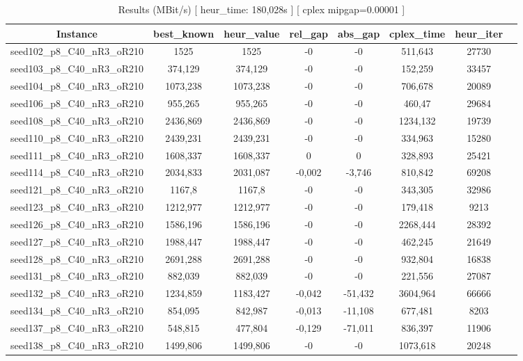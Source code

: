 \documentclass[a4paper]{article}
\begin{document}
\begin{center}
\begin{longtable}{cccccccc}
\caption{Results (MBit/s) [ heur\_time: 180,028s ]  [ cplex mipgap=0.00001 ]}
\tabularnewline
\hline
Instance & best\_known & heur\_value & rel\_gap & abs\_gap & cplex\_time & heur\_iter\\
\hline
seed102\_p8\_C40\_nR3\_oR210 & 1525 & 1525 & -0 & -0 & 511,643 & 27730\\
\hline
seed103\_p8\_C40\_nR3\_oR210 & 374,129 & 374,129 & -0 & -0 & 152,259 & 33457\\
\hline
seed104\_p8\_C40\_nR3\_oR210 & 1073,238 & 1073,238 & -0 & -0 & 706,678 & 20089\\
\hline
seed106\_p8\_C40\_nR3\_oR210 & 955,265 & 955,265 & -0 & -0 & 460,47 & 29684\\
\hline
seed108\_p8\_C40\_nR3\_oR210 & 2436,869 & 2436,869 & -0 & -0 & 1234,132 & 19739\\
\hline
seed110\_p8\_C40\_nR3\_oR210 & 2439,231 & 2439,231 & -0 & -0 & 334,963 & 15280\\
\hline
seed111\_p8\_C40\_nR3\_oR210 & 1608,337 & 1608,337 & 0 & 0 & 328,893 & 25421\\
\hline
seed114\_p8\_C40\_nR3\_oR210 & 2034,833 & 2031,087 & -0,002 & -3,746 & 810,842 & 69208\\
\hline
seed121\_p8\_C40\_nR3\_oR210 & 1167,8 & 1167,8 & -0 & -0 & 343,305 & 32986\\
\hline
seed123\_p8\_C40\_nR3\_oR210 & 1212,977 & 1212,977 & -0 & -0 & 179,418 & 9213\\
\hline
seed126\_p8\_C40\_nR3\_oR210 & 1586,196 & 1586,196 & -0 & -0 & 2268,444 & 28392\\
\hline
seed127\_p8\_C40\_nR3\_oR210 & 1988,447 & 1988,447 & -0 & -0 & 462,245 & 21649\\
\hline
seed128\_p8\_C40\_nR3\_oR210 & 2691,288 & 2691,288 & -0 & -0 & 932,804 & 16838\\
\hline
seed131\_p8\_C40\_nR3\_oR210 & 882,039 & 882,039 & -0 & -0 & 221,556 & 27087\\
\hline
seed132\_p8\_C40\_nR3\_oR210 & 1234,859 & 1183,427 & -0,042 & -51,432 & 3604,964 & 66666\\
\hline
seed134\_p8\_C40\_nR3\_oR210 & 854,095 & 842,987 & -0,013 & -11,108 & 677,481 & 8203\\
\hline
seed137\_p8\_C40\_nR3\_oR210 & 548,815 & 477,804 & -0,129 & -71,011 & 836,397 & 11906\\
\hline
seed138\_p8\_C40\_nR3\_oR210 & 1499,806 & 1499,806 & -0 & -0 & 1073,618 & 20248\\

\end{longtable}
\end{center}
\end{document}
